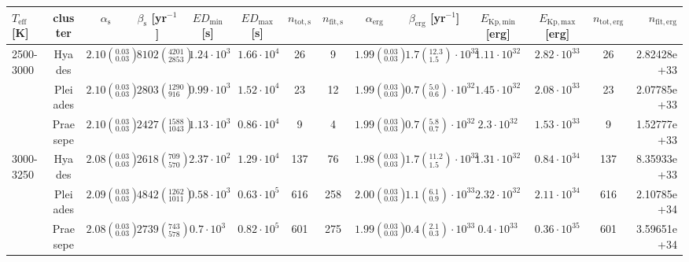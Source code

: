 \begin{tabular}{lccccccccccccr}
\hline
 $T_\mathrm{eff}$ [K] & cluster &            $\alpha_\mathrm{s}$ &     $\beta_\mathrm{s}$ [yr$^{-1}$] & $ED_\mathrm{min}$ [s] & $ED_\mathrm{max}$ [s] & $n_\mathrm{tot,s}$ & $n_\mathrm{fit,s}$ &              $\alpha_\mathrm{erg}$ &              $\beta_\mathrm{erg}$ [yr$^{-1}$] & $E_\mathrm{Kp,min}$ [erg] & $E_\mathrm{Kp,max}$ [erg] & $n_\mathrm{tot,erg}$ & $n_\mathrm{fit,erg}$ \\
\hline
2500-3000 & Hyades &  $2.10\left(^{0.03}_{0.03}\right)$ &  $8102\left(^{4201}_{2853}\right)$ &    $1.24\cdot 10^{3}$ &    $1.66\cdot 10^{4}$ &                 26 &                  9 &  $1.99\left(^{0.03}_{0.03}\right)$ &  $1.7\left(^{12.3}_{1.5}\right)\cdot 10^{32}$ &       $1.11\cdot 10^{32}$ &       $2.82\cdot 10^{33}$ &                   26 &          2.82428e+33 \\
          & Pleiades &  $2.10\left(^{0.03}_{0.03}\right)$ &   $2803\left(^{1290}_{916}\right)$ &    $0.99\cdot 10^{3}$ &    $1.52\cdot 10^{4}$ &                 23 &                 12 &  $1.99\left(^{0.03}_{0.03}\right)$ &   $0.7\left(^{5.0}_{0.6}\right)\cdot 10^{32}$ &       $1.45\cdot 10^{32}$ &       $2.08\cdot 10^{33}$ &                   23 &          2.07785e+33 \\
          & Praesepe &  $2.10\left(^{0.03}_{0.03}\right)$ &  $2427\left(^{1588}_{1043}\right)$ &    $1.13\cdot 10^{3}$ &    $0.86\cdot 10^{4}$ &                  9 &                  4 &  $1.99\left(^{0.03}_{0.03}\right)$ &   $0.7\left(^{5.8}_{0.7}\right)\cdot 10^{32}$ &        $2.3\cdot 10^{32}$ &       $1.53\cdot 10^{33}$ &                    9 &          1.52777e+33 \\
3000-3250 & Hyades &  $2.08\left(^{0.03}_{0.03}\right)$ &    $2618\left(^{709}_{570}\right)$ &    $2.37\cdot 10^{2}$ &    $1.29\cdot 10^{4}$ &                137 &                 76 &  $1.98\left(^{0.03}_{0.03}\right)$ &  $1.7\left(^{11.2}_{1.5}\right)\cdot 10^{32}$ &       $1.31\cdot 10^{32}$ &       $0.84\cdot 10^{34}$ &                  137 &          8.35933e+33 \\
          & Pleiades &  $2.09\left(^{0.03}_{0.03}\right)$ &  $4842\left(^{1262}_{1011}\right)$ &    $0.58\cdot 10^{3}$ &    $0.63\cdot 10^{5}$ &                616 &                258 &  $2.00\left(^{0.03}_{0.03}\right)$ &   $1.1\left(^{6.1}_{0.9}\right)\cdot 10^{33}$ &       $2.32\cdot 10^{32}$ &       $2.11\cdot 10^{34}$ &                  616 &          2.10785e+34 \\
          & Praesepe &  $2.08\left(^{0.03}_{0.03}\right)$ &    $2739\left(^{743}_{578}\right)$ &     $0.7\cdot 10^{3}$ &    $0.82\cdot 10^{5}$ &                601 &                275 &  $1.99\left(^{0.03}_{0.03}\right)$ &   $0.4\left(^{2.1}_{0.3}\right)\cdot 10^{33}$ &        $0.4\cdot 10^{33}$ &       $0.36\cdot 10^{35}$ &                  601 &          3.59651e+34 \\

\end{tabular}
